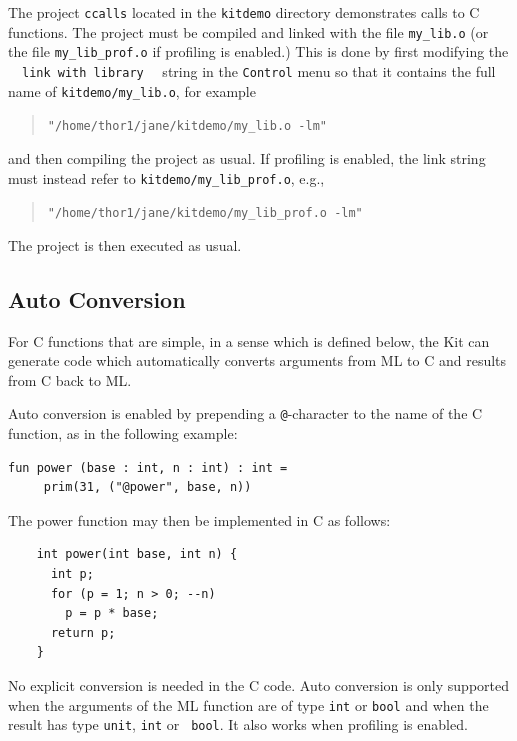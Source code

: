 \documentclass[12pt]{book}
\begin{document}
The project {\tt ccalls} located in the {\tt kitdemo} directory
demonstrates calls to C functions. The project must be compiled and linked
with the file {\tt my\_lib.o} (or the file {\tt my\_lib\_prof.o} if
profiling is enabled.) This is done by first modifying the ~~\texttt{link
  with library}~~ string in the {\tt Control} menu so that it contains
the full name of  {\tt kitdemo/my\_lib.o}, for example
\begin{quote}
\texttt{"/home/thor1/jane/kitdemo/my\_lib.o -lm"}
\end{quote}
\noindent
and then compiling the project as usual. If
profiling is enabled, the link string must instead refer to {\tt kitdemo/my\_lib\_prof.o}, e.g., 
\begin{quote}
\texttt{"/home/thor1/jane/kitdemo/my\_lib\_prof.o -lm"}
\end{quote}
\noindent
The project is then executed as usual.

\subsection{Auto Conversion} 
For C functions that are simple, in a sense which is 
defined below, the  Kit can generate code which 
automatically converts arguments
from ML to C and results from C back to ML.

Auto conversion is enabled by prepending a {\tt @}-character to
the name of the C function, as in the following example:

\begin{verbatim}
fun power (base : int, n : int) : int = 
     prim(31, ("@power", base, n))
\end{verbatim}

\noindent
The power function may then be implemented in C as follows:

\begin{verbatim}
    int power(int base, int n) {
      int p;
      for (p = 1; n > 0; --n)
        p = p * base;
      return p;
    }
\end{verbatim}

\noindent
No explicit conversion is needed in the C code. Auto conversion is only
supported when the arguments of the ML function are of type {\tt int} or
{\tt bool} and when the result has type {\tt unit}, {\tt int} or {\tt
  bool}. It also works when profiling is enabled.
\end{document}
